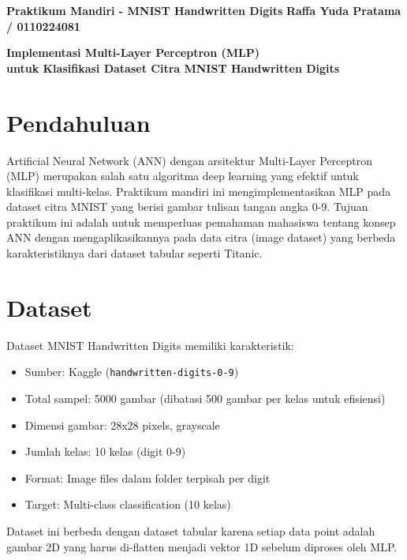\documentclass[12pt,a4paper]{article}
\begin{document}
\noindent
\textbf{Praktikum Mandiri - MNIST Handwritten Digits} \hfill \textbf{Raffa Yuda Pratama / 0110224081}

\vspace{1em}

\begin{center}
\textbf{\large Implementasi Multi-Layer Perceptron (MLP)} \\
\textbf{\large untuk Klasifikasi Dataset Citra MNIST Handwritten Digits}
\end{center}

\vspace{1em}

\section{Pendahuluan}

Artificial Neural Network (ANN) dengan arsitektur Multi-Layer Perceptron (MLP) merupakan salah satu algoritma deep learning yang efektif untuk klasifikasi multi-kelas. Praktikum mandiri ini mengimplementasikan MLP pada dataset citra MNIST yang berisi gambar tulisan tangan angka 0-9. Tujuan praktikum ini adalah untuk memperluas pemahaman mahasiswa tentang konsep ANN dengan mengaplikasikannya pada data citra (image dataset) yang berbeda karakteristiknya dari dataset tabular seperti Titanic.

\section{Dataset}

Dataset MNIST Handwritten Digits memiliki karakteristik:
\begin{itemize}
    \item Sumber: Kaggle (\texttt{handwritten-digits-0-9})
    \item Total sampel: 5000 gambar (dibatasi 500 gambar per kelas untuk efisiensi)
    \item Dimensi gambar: 28x28 pixels, grayscale
    \item Jumlah kelas: 10 kelas (digit 0-9)
    \item Format: Image files dalam folder terpisah per digit
    \item Target: Multi-class classification (10 kelas)
\end{itemize}

Dataset ini berbeda dengan dataset tabular karena setiap data point adalah gambar 2D yang harus di-flatten menjadi vektor 1D sebelum diproses oleh MLP.
\end{document}
